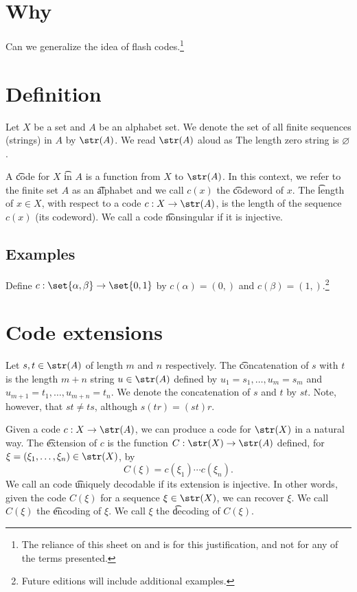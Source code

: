 

\section*{Why}

Can we generalize the idea of flash codes.\footnote{The reliance of this sheet on and is for this justification, and not for any of the terms presented.}

\section*{Definition}

Let $X$ be a set and $A$ be an alphabet set.
We denote the set of all finite sequences (strings) in $A$ by $\str(A)$.
We read $\str(A)$ aloud as 
The length zero string is $\varnothing$.

A \t{code} for $X$ \t{in} $A$ is a function from $X$ to $\str(A)$.
In this context, we refer to the finite set $A$ as an \t{alphabet} and we call $c(x)$ the \t{codeword} of $x$.
The \t{length} of $x \in X$, with respect to a code $c: X \to \str(A)$, is the length of the sequence $c(x)$ (its codeword).
We call a code \t{nonsingular} if it is injective.

\subsection*{Examples}

Define $c: \set{\alpha , \beta } \to \set{0, 1}$ by $c(\alpha ) = (0,)$ and $c(\beta ) = (1,)$.\footnote{Future editions will include additional examples.}

\section*{Code extensions}


Let $s,t \in \str(A)$ of length $m$ and $n$ respectively.
The \t{concatenation} of $s$ with $t$ is the length $m+n$ string $u \in \str(A)$ defined by $u_{1} = s_1, \dots , u_m = s_m$ and $u_{m+1} = t_1, \dots , u_{m+n} = t_n$.
We denote the concatenation of $s$ and $t$ by $st$.
Note, however, that $st \neq ts$, although $s(tr) = (st)r$.

Given a code $c: X \to \str(A)$, we can produce a code for $\str(X)$ in a natural way.
The \t{extension} of $c$ is the function $C: \str(X) \to \str(A)$ defined, for $\xi  = (\xi _1, \dots , \xi _n) \in \str(X)$, by
    \[
C(\xi ) = c(\xi _1) \cdots c(\xi _n).
    \]
We call an code \t{uniquely decodable} if its extension is injective.
In other words, given the code $C(\xi )$ for a sequence $\xi \in \str(X)$, we can recover $\xi $.
We call $C(\xi )$ the \t{encoding} of $\xi $.
We call $\xi $ the \t{decoding} of $C(\xi )$.
